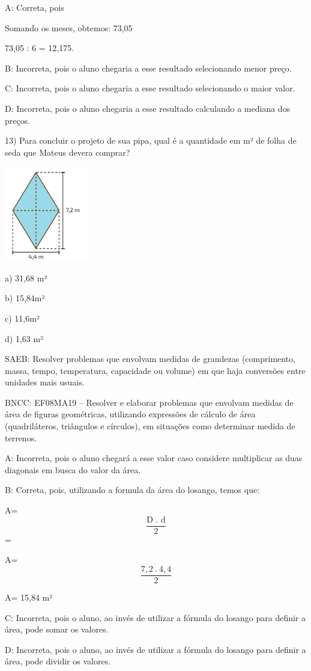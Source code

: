 A: Correta, pois

Somando os meses, obtemos: 73,05

73,05 : 6 = 12,175.

B: Incorreta, pois o aluno chegaria a esse resultado selecionando menor
preço.

C: Incorreta, pois o aluno chegaria a esse resultado selecionando o
maior valor.

D: Incorreta, pois o aluno chegaria a esse resultado calculando a
mediana dos preços.

13) Para concluir o projeto de sua pipa, qual é a quantidade em m² de
folha de seda que Mateus devera comprar?

\includegraphics[width=1.45833in,height=1.63333in]{./imgSAEB_8_MAT/media/image59.png}

a) 31,68 m²

b) 15,84m²

c) 11,6m²

d) 1,63 m²

SAEB: Resolver problemas que envolvam medidas de grandezas (comprimento,
massa, tempo, temperatura, capacidade ou volume) em que haja conversões
entre unidades mais usuais.

BNCC: EF08MA19 -- Resolver e elaborar problemas que envolvam medidas de
área de figuras geométricas, utilizando expressões de cálculo de área
(quadriláteros, triângulos e círculos), em situações como determinar
medida de terrenos.

A: Incorreta, pois o aluno chegará a esse valor caso considere
multiplicar as duas diagonais em busca do valor da área.

B: Correta, pois, utilizando a formula da área do losango, temos que:

A=\[\frac{\text{D\ .\ d}}{2}\]=

A= \[\frac{7,2\ .\ 4,4}{2}\]

A= 15,84 m²

C: Incorreta, pois o aluno, ao invés de utilizar a fórmula do losango
para definir a área, pode somar os valores.

D: Incorreta, pois o aluno, ao invés de utilizar a fórmula do losango
para definir a área, pode dividir os valores.

